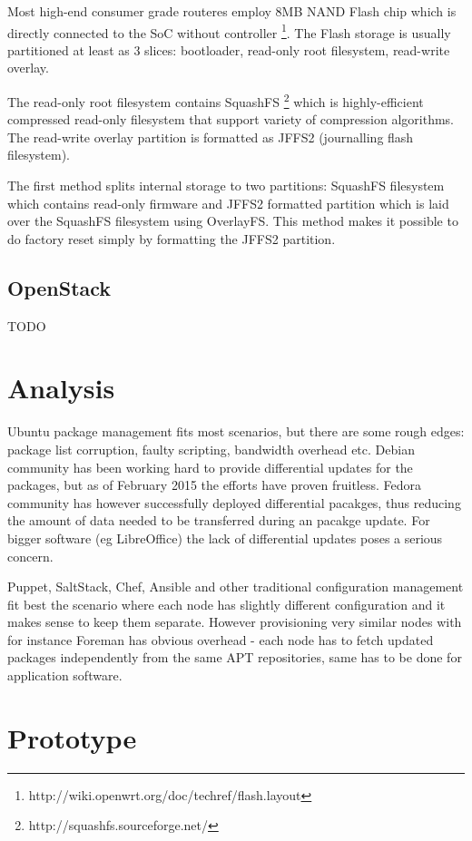 \documentclass{article}
\begin{document}
Most high-end consumer grade routeres employ 8MB NAND Flash chip which is directly connected to the SoC without controller \footnote{http://wiki.openwrt.org/doc/techref/flash.layout}. The Flash storage is usually partitioned at least as 3 slices: bootloader, read-only root filesystem, read-write overlay.

The read-only root filesystem contains SquashFS \footnote{http://squashfs.sourceforge.net/} which is highly-efficient compressed read-only filesystem that support variety of compression algorithms. The read-write overlay partition is formatted as JFFS2 (journalling flash filesystem).

The first method splits internal storage to two partitions: SquashFS filesystem which contains read-only firmware and JFFS2 formatted partition which is laid over the SquashFS filesystem using OverlayFS. This method makes it possible to do factory reset simply by formatting the JFFS2 partition.

\subsection{OpenStack}

TODO

\section{Analysis}

Ubuntu package management fits most scenarios, but there are some rough edges: package list corruption, faulty scripting, bandwidth overhead etc. Debian community has been working hard to provide differential updates for the packages, but as of February 2015 the efforts have proven fruitless. Fedora community has however successfully deployed differential pacakges, thus reducing the amount of data needed to be transferred during an pacakge update. For bigger software (eg LibreOffice) the lack of differential updates poses a serious concern.

Puppet, SaltStack, Chef, Ansible and other traditional configuration management fit best the scenario where each node has slightly different configuration and it makes sense to keep them separate. However provisioning very similar nodes with for instance Foreman has obvious overhead - each node has to fetch updated packages independently from the same APT repositories, same has to be done for application software.

\section{Prototype}
\end{document}

